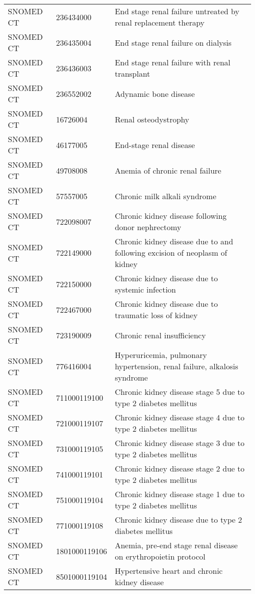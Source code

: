 \begin{longtable}{p{}p{}p{}}
  SNOMED CT & 236434000 & End stage renal failure untreated by renal replacement therapy \\ 
  SNOMED CT & 236435004 & End stage renal failure on dialysis \\ 
  SNOMED CT & 236436003 & End stage renal failure with renal transplant \\ 
  SNOMED CT & 236552002 & Adynamic bone disease \\ 
  SNOMED CT & 16726004 & Renal osteodystrophy \\ 
  SNOMED CT & 46177005 & End-stage renal disease \\ 
  SNOMED CT & 49708008 & Anemia of chronic renal failure \\ 
  SNOMED CT & 57557005 & Chronic milk alkali syndrome \\ 
  SNOMED CT & 722098007 & Chronic kidney disease following donor nephrectomy \\ 
  SNOMED CT & 722149000 & Chronic kidney disease due to and following excision of neoplasm of kidney \\ 
  SNOMED CT & 722150000 & Chronic kidney disease due to systemic infection \\ 
  SNOMED CT & 722467000 & Chronic kidney disease due to traumatic loss of kidney \\ 
  SNOMED CT & 723190009 & Chronic renal insufficiency \\ 
  SNOMED CT & 776416004 & Hyperuricemia, pulmonary hypertension, renal failure, alkalosis syndrome \\ 
  SNOMED CT & 711000119100 & Chronic kidney disease stage 5 due to type 2 diabetes mellitus \\ 
  SNOMED CT & 721000119107 & Chronic kidney disease stage 4 due to type 2 diabetes mellitus \\ 
  SNOMED CT & 731000119105 & Chronic kidney disease stage 3 due to type 2 diabetes mellitus \\ 
  SNOMED CT & 741000119101 & Chronic kidney disease stage 2 due to type 2 diabetes mellitus \\ 
  SNOMED CT & 751000119104 & Chronic kidney disease stage 1 due to type 2 diabetes mellitus \\ 
  SNOMED CT & 771000119108 & Chronic kidney disease due to type 2 diabetes mellitus \\ 
  SNOMED CT & 1801000119106 & Anemia, pre-end stage renal disease on erythropoietin protocol \\ 
  SNOMED CT & 8501000119104 & Hypertensive heart and chronic kidney disease \\ 

\end{longtable}

